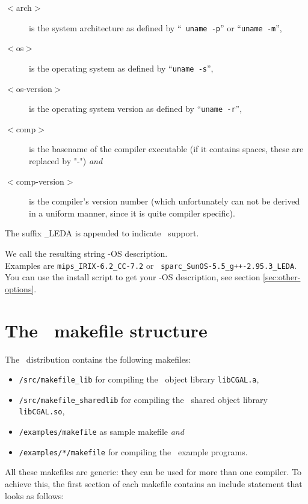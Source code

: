 \begin{description}
\item[$<$arch$>$] is the system architecture as defined by ``{\tt
    uname -p}'' or ``\texttt{uname -m}'',
\item[$<$os$>$] is the operating system as defined by ``\texttt{uname
    -s}'',
\item[$<$os-version$>$] is the operating system version as defined by
  ``\texttt{uname -r}'',
\item[$<$comp$>$] is the basename of the compiler executable (if it
  contains spaces, these are replaced by "-") \textit{and}
\item[$<$comp-version$>$] is the compiler's version number (which
  unfortunately can not be derived in a uniform manner, since it is
  quite compiler specific).
\end{description}

The suffix \texttt{\_}LEDA is appended to indicate \leda\ support. 

We call the resulting string \cgal-OS description.\\ Examples are
\texttt{mips\_IRIX-6.2\_CC-7.2} or {\tt
  sparc\_SunOS-5.5\_g++-2.95.3\_LEDA}.\\ You can use the install script
to get your \cgal-OS description, see section \ref{sec:other-options}.

\section{The \cgal\ makefile structure}\label{sec:makefiles}

The \cgal\ distribution contains the following makefiles:
\begin{itemize}
\item \texttt{\cgaldir/src/makefile\_lib} for compiling the \cgal\ 
  object library \texttt{libCGAL.a},
  
\item \texttt{\cgaldir/src/makefile\_sharedlib} for compiling the
  \cgal\ shared object library \texttt{libCGAL.so},
  
\item \texttt{\cgaldir/examples/makefile} as sample makefile
  \textit{and}
  
\item \texttt{\cgaldir/examples/*/makefile} for compiling the \cgal\ 
  example programs.
\end{itemize}

All these makefiles are generic: they can be used for more than one
compiler.  To achieve this, the first section of each makefile
contains an include statement that looks as follows:

